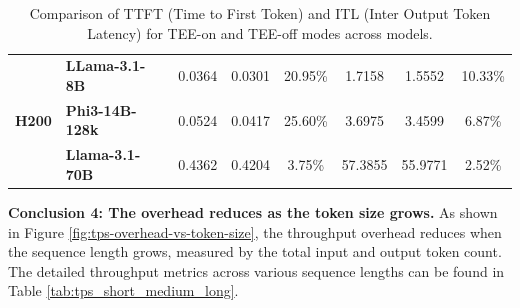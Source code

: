 \documentclass{article}
\begin{document}
\begin{table}[htbp]
\begin{tabular}{llccc|ccc}
        \midrule
        \multirow{3}{*}{\textbf{H200}} & \textbf{LLama-3.1-8B}  & 0.0364                                & 0.0301                               & 20.95\%                                                                    & 1.7158          & 1.5552           & 10.33\%                                                                    \\
                                       & \textbf{Phi3-14B-128k} & 0.0524                                & 0.0417                               & 25.60\%                                                                    & 3.6975          & 3.4599           & 6.87\%                                                                     \\
                                       & \textbf{Llama-3.1-70B} & 0.4362                                & 0.4204                               & 3.75\%                                                                     & 57.3855         & 55.9771          & 2.52\%                                                                     \\
        \bottomrule
    \end{tabular}
    \caption{Comparison of TTFT (Time to First Token) and ITL (Inter Output Token Latency) for TEE-on and TEE-off modes across models.}
    \label{tab:latency_tee_on_ff}
\end{table}

\noindent\textbf{Conclusion 4: The overhead reduces as the token size grows.} As shown in Figure \ref{fig:tps-overhead-vs-token-size}, the throughput overhead reduces when the sequence length grows, measured by the total input and output token count. The detailed throughput metrics across various sequence lengths can be found in Table \ref{tab:tps_short_medium_long}.
\end{document}
